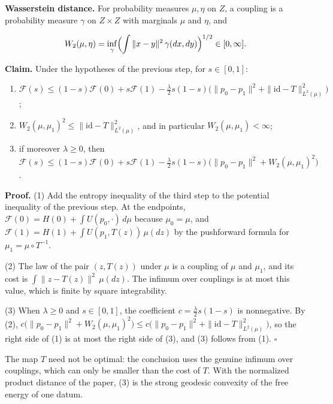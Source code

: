 \documentclass[11pt,a4paper]{report}
\begin{document}
\textbf{Wasserstein distance.} For probability measures \(\mu,\eta\) on \(Z\), a coupling is a probability measure \(\gamma\) on \(Z\times Z\) with marginals \(\mu\) and \(\eta\), and


\[W_2(\mu,\eta)=\inf_\gamma\Bigl(\int\|x-y\|^2\,\gamma(dx,dy)\Bigr)^{1/2}\in[0,\infty].\]


\textbf{Claim.} Under the hypotheses of the previous step, for \(s\in[0,1]\):



\begin{enumerate}


\item \(\mathcal F(s)\le(1-s)\mathcal F(0)+s\mathcal F(1)-\frac\lambda2s(1-s)\bigl(\|p_0-p_1\|^2+\|\mathrm{id}-T\|_{L^2(\mu)}^2\bigr)\);

\item \(W_2(\mu,\mu_1)^2\le\|\mathrm{id}-T\|_{L^2(\mu)}^2\), and in particular \(W_2(\mu,\mu_1)<\infty\);

\item if moreover \(\lambda\ge0\), then \(\mathcal F(s)\le(1-s)\mathcal F(0)+s\mathcal F(1)-\frac\lambda2s(1-s)\bigl(\|p_0-p_1\|^2+W_2(\mu,\mu_1)^2\bigr)\).

\end{enumerate}



\textbf{Proof.} (1) Add the entropy inequality of the third step to the potential inequality of the previous step. At the endpoints, \(\mathcal F(0)=H(0)+\int U(p_0,\cdot)\,d\mu\) because \(\mu_0=\mu\), and \(\mathcal F(1)=H(1)+\int U(p_1,T(z))\,\mu(dz)\) by the pushforward formula for \(\mu_1=\mu\circ T^{-1}\).




(2) The law of the pair \((z,T(z))\) under \(\mu\) is a coupling of \(\mu\) and \(\mu_1\), and its cost is \(\int\|z-T(z)\|^2\,\mu(dz)\). The infimum over couplings is at most this value, which is finite by square integrability.




(3) When \(\lambda\ge0\) and \(s\in[0,1]\), the coefficient \(c=\frac\lambda2s(1-s)\) is nonnegative. By (2), \(c\bigl(\|p_0-p_1\|^2+W_2(\mu,\mu_1)^2\bigr)\le c\bigl(\|p_0-p_1\|^2+\|\mathrm{id}-T\|_{L^2(\mu)}^2\bigr)\), so the right side of (1) is at most the right side of (3), and (3) follows from (1). \(\square\)




The map \(T\) need not be optimal: the conclusion uses the genuine infimum over couplings, which can only be smaller than the cost of \(T\). With the normalized product distance of the paper, (3) is the strong geodesic convexity of the free energy of one datum.
\end{document}
